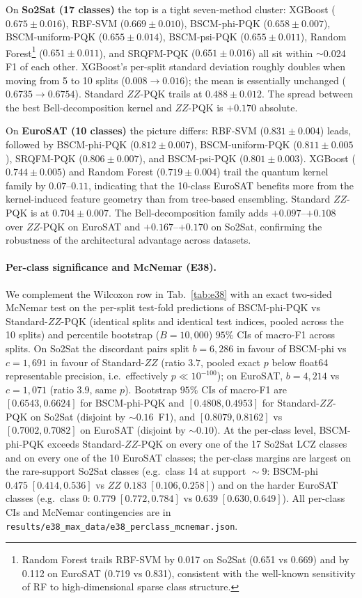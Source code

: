 \documentclass[pdflatex,sn-mathphys]{sn-jnl}
\theoremstyle{plain}
\theoremstyle{remark}
\theoremstyle{definition}
\begin{document}
On \textbf{So2Sat (17 classes)} the top is a tight seven-method cluster: XGBoost ($0.675\pm 0.016$), RBF-SVM ($0.669\pm 0.010$), BSCM-phi-PQK ($0.658\pm 0.007$), BSCM-uniform-PQK ($0.655\pm 0.014$), BSCM-psi-PQK ($0.655\pm 0.011$), Random Forest\footnote{Random Forest trails RBF-SVM by 0.017 on So2Sat (0.651 vs 0.669) and by 0.112 on EuroSAT (0.719 vs 0.831), consistent with the well-known sensitivity of RF to high-dimensional sparse class structure.} ($0.651\pm 0.011$), and SRQFM-PQK ($0.651\pm 0.016$) all sit within $\sim$0.024 F1 of each other.  XGBoost's per-split standard deviation roughly doubles when moving from 5 to 10 splits ($0.008\!\to\!0.016$); the mean is essentially unchanged ($0.6735\!\to\!0.6754$).  Standard $ZZ$-PQK trails at $0.488\pm 0.012$. The spread between the best Bell-decomposition kernel and $ZZ$-PQK is $+0.170$ absolute.

On \textbf{EuroSAT (10 classes)} the picture differs: RBF-SVM ($0.831\pm 0.004$) leads, followed by BSCM-phi-PQK ($0.812\pm 0.007$), BSCM-uniform-PQK ($0.811\pm 0.005$), SRQFM-PQK ($0.806\pm 0.007$), and BSCM-psi-PQK ($0.801\pm 0.003$). XGBoost ($0.744\pm 0.005$) and Random Forest ($0.719\pm 0.004$) trail the quantum kernel family by $0.07$--$0.11$, indicating that the 10-class EuroSAT benefits more from the kernel-induced feature geometry than from tree-based ensembling. Standard $ZZ$-PQK is at $0.704\pm 0.007$. The Bell-decomposition family adds $+0.097$--$+0.108$ over $ZZ$-PQK on EuroSAT and $+0.167$--$+0.170$ on So2Sat, confirming the robustness of the architectural advantage across datasets.

\paragraph{Per-class significance and McNemar (E38).}
We complement the Wilcoxon row in Tab.~\ref{tab:e38} with an exact two-sided McNemar test on the per-split test-fold predictions of BSCM-phi-PQK vs Standard-$ZZ$-PQK (identical splits and identical test indices, pooled across the 10 splits) and percentile bootstrap ($B=10{,}000$) $95\%$ CIs of macro-F1 across splits.  On So2Sat the discordant pairs split $b\!=\!6{,}286$ in favour of BSCM-phi vs $c\!=\!1{,}691$ in favour of Standard-$ZZ$ (ratio $3.7$, pooled exact $p$ below float64 representable precision, i.e.\ effectively $p\!\ll\!10^{-100}$); on EuroSAT, $b\!=\!4{,}214$ vs $c\!=\!1{,}071$ (ratio $3.9$, same $p$).  Bootstrap $95\%$ CIs of macro-F1 are $[0.6543, 0.6624]$ for BSCM-phi-PQK and $[0.4808, 0.4953]$ for Standard-$ZZ$-PQK on So2Sat (disjoint by $\sim\!0.16$~F1), and $[0.8079, 0.8162]$ vs $[0.7002, 0.7082]$ on EuroSAT (disjoint by $\sim\!0.10$).  At the per-class level, BSCM-phi-PQK exceeds Standard-$ZZ$-PQK on every one of the 17 So2Sat LCZ classes and on every one of the 10 EuroSAT classes; the per-class margins are largest on the rare-support So2Sat classes (e.g.\ class 14 at support $\!\sim\!9$: BSCM-phi $0.475\;[0.414, 0.536]$ vs $ZZ$ $0.183\;[0.106, 0.258]$) and on the harder EuroSAT classes (e.g.\ class 0: $0.779\;[0.772, 0.784]$ vs $0.639\;[0.630, 0.649]$).  All per-class CIs and McNemar contingencies are in \texttt{results/e38\_max\_data/e38\_perclass\_mcnemar.json}.
\end{document}
